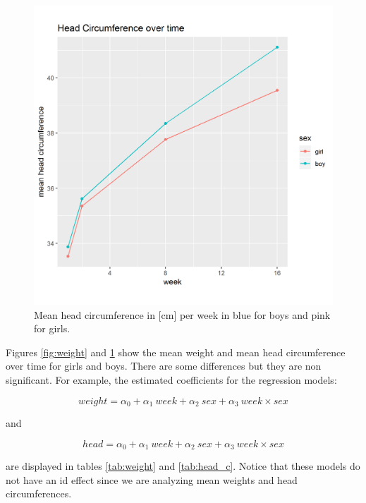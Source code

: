 \documentclass[12pt]{article}
\begin{document}
\begin{figure}[!htb]
  \centering
  \includegraphics[width=\textwidth]{../wANDhc/head_c.png}
  \caption{Mean head circumference in [cm] per week in blue for boys and pink for girls.}
  \label{fig:head_c}
\end{figure}

Figures \ref{fig:weight} and \ref{fig:head_c} show the mean weight and mean head circumference over time for girls and boys. There are some differences but they are non significant. For example, the estimated coefficients for the regression models:

\begin{equation*}
weight = \alpha_0 + \alpha_1 \ week + \alpha_2 \ sex + \alpha_3 \ week \times sex
\end{equation*}

and

\begin{equation*}
head = \alpha_0 + \alpha_1 \ week + \alpha_2 \ sex + \alpha_3 \ week \times sex
\end{equation*}

are displayed in tables \ref{tab:weight} and \ref{tab:head_c}. Notice that these models do not have an id effect since we are analyzing mean weights and head circumferences.
\end{document}

